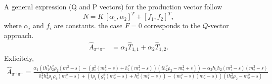 \documentclass[aps,prd,superscriptaddress,onecolumn,nofootinbib,preprintnumbers,notitlepage]{revtex4-1}
\begin{document}
A general expression (Q and P vectors) for the production vector follow
\begin{equation}
  N = K\,[\alpha_1, \alpha_2]^T + [f_1, f_2]^T,
\end{equation}
where $\alpha_i$ and $f_i$ are constants.
the case $F = 0$ corresponds to the $Q$-vector approach.
\begin{align} \label{eq:production}
\hat{A}_{\pi^+\pi^-} &= \alpha_{1} \hat{T}_{1,1} + \alpha_{2} \hat{T}_{1,2}.
\end{align}
Exlicitely,
\begin{align}
  \hat{A}_{\pi^+\pi^-} = \frac{
    \alpha_{1} \left(i h_{1}^{2} h_{2}^{2} \rho_{2} \left(m_{1}^{2} - s\right) -
    \left(g_{1}^{2} \left(m_{2}^{2} - s\right) + h_{1}^{2} \left(m_{1}^{2} - s\right)\right)
    \left(i h_{2}^{2} \rho_{2} - m_{2}^{2} + s\right)\right) +
    \alpha_{2} h_{1} h_{2} \left(m_{1}^{2} - s\right)
    \left(m_{2}^{2} - s\right)
  }{
    h_{1}^{2} h_{2}^{2} \rho_{1} \rho_{2} (m_{1}^{2} - s) +
    \left(i \rho_{1} \left(g_{1}^{2} \left(m_{2}^{2} - s\right) + h_{1}^{2} \left(m_{1}^{2} - s\right)\right) -
    \left(m_{1}^{2} - s\right) \left(m_{2}^{2} - s\right)\right)
    \left(i h_{2}^{2} \rho_{2} - m_{2}^{2} + s\right)}
\end{align}
\end{document}
